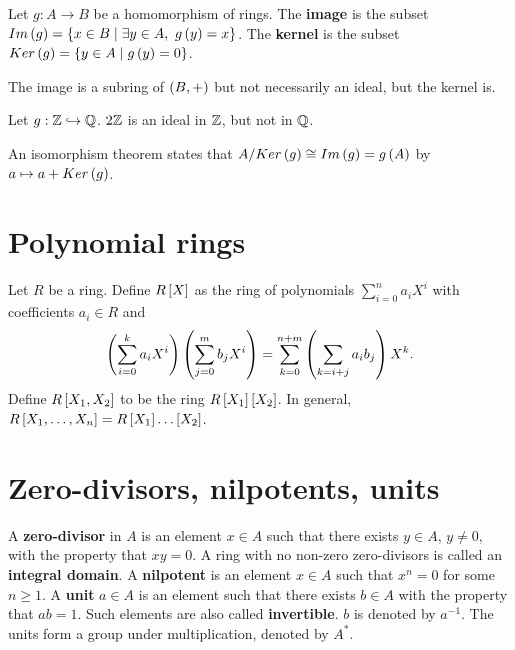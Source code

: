 \begin{definition}
Let $ g : A \to B $ be a homomorphism of rings. The \textbf{image} is the subset $ Im\rb{g} = \cb{x \in B \mid \exists y \in A, \ g\rb{y} = x} $. The \textbf{kernel} is the subset $ Ker\rb{g} = \cb{y \in A \mid g\rb{y} = 0} $.
\end{definition}

The image is a subring of $ \rb{B, +} $ but not necessarily an ideal, but the kernel is.

\begin{example*}
Let $ g : \Z \hookrightarrow \Q $. $ 2\Z $ is an ideal in $ \Z $, but not in $ \Q $.
\end{example*}

An isomorphism theorem states that $ A / Ker\rb{g} \cong Im\rb{g} = g\rb{A} $ by $ a \mapsto a + Ker\rb{g} $.

\pagebreak

\section{Polynomial rings}

Let $ R $ be a ring. Define $ R\sb{X} $ as the ring of polynomials $ \sum_{i = 0}^n a_iX^i $ with coefficients $ a_i \in R $ and
$$ \rb{\sum_{i = 0}^k a_iX^i}\rb{\sum_{j = 0}^m b_jX^i} = \sum_{k = 0}^{n + m} \rb{\sum_{k = i + j} a_ib_j}X^k. $$
Define $ R\sb{X_1, X_2} $ to be the ring $ R\sb{X_1}\sb{X_2} $. In general, $ R\sb{X_1, \dots, X_n} = R\sb{X_1} \dots \sb{X_2} $.

\pagebreak

\section{Zero-divisors, nilpotents, units}

\begin{definition}
A \textbf{zero-divisor} in $ A $ is an element $ x \in A $ such that there exists $ y \in A $, $ y \ne 0 $, with the property that $ xy = 0 $. A ring with no non-zero zero-divisors is called an \textbf{integral domain}. A \textbf{nilpotent} is an element $ x \in A $ such that $ x^n = 0 $ for some $ n \ge 1 $. A \textbf{unit} $ a \in A $ is an element such that there exists $ b \in A $ with the property that $ ab = 1 $. Such elements are also called \textbf{invertible}. $ b $ is denoted by $ a^{-1} $. The units form a group under multiplication, denoted by $ A^* $.
\end{definition}

